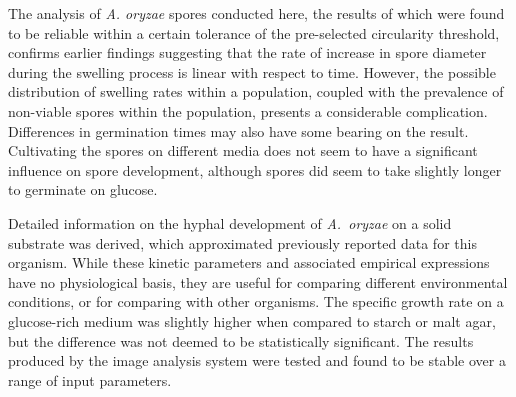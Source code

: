 The analysis of \emph{A. oryzae} spores conducted here, the results of which were found to be reliable within a certain tolerance of the pre-selected circularity threshold, confirms earlier findings suggesting that the rate of increase in spore diameter during the swelling process is linear with respect to time. However, the possible distribution of swelling rates within a population, coupled with the prevalence of non-viable spores within the population, presents a considerable complication. Differences in germination times may also have some bearing on the result. Cultivating the spores on different media does not seem to have a significant influence on spore development, although spores did seem to take slightly longer to germinate on glucose.

Detailed information on the hyphal development of \emph{A.~oryzae} on a solid substrate was derived, which approximated previously reported data for this organism.  While these kinetic parameters and associated empirical expressions have no physiological basis, they are useful for comparing different environmental conditions, or for comparing with other organisms. The specific growth rate on a glucose-rich medium was slightly higher when compared to starch or malt agar, but the difference was not deemed to be statistically significant. The results produced by the image analysis system were tested and found to be stable over a range of input parameters.